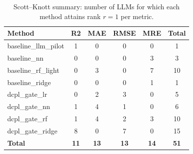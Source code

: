 \begin{table}[t]
\centering
\scriptsize
\setlength{\tabcolsep}{4pt}
\renewcommand{\arraystretch}{1.1}
\caption{Scott--Knott summary: number of LLMs for which each method attains rank $r=1$ per metric.}
\label{tab:sk_summary_rank1_by_metric}
\begin{tabular}{l|ccccc}
\hline
\textbf{Method} & \textbf{R2} & \textbf{MAE} & \textbf{RMSE} & \textbf{MRE} & \textbf{Total} \\
\hline
baseline\_llm\_pilot & 1 & 0 & 0 & 0 & 1 \\
baseline\_nn & 0 & 0 & 0 & 3 & 3 \\
baseline\_rf\_light & 0 & 3 & 0 & 7 & 10 \\
baseline\_ridge & 0 & 0 & 0 & 1 & 1 \\
dcpl\_gate\_lr & 0 & 2 & 3 & 0 & 5 \\
dcpl\_gate\_nn & 1 & 4 & 1 & 0 & 6 \\
dcpl\_gate\_rf & 1 & 4 & 2 & 3 & 10 \\
dcpl\_gate\_ridge & 8 & 0 & 7 & 0 & 15 \\
\hline
\textbf{Total} & \textbf{11} & \textbf{13} & \textbf{13} & \textbf{14} & \textbf{51} \\
\hline
\end{tabular}
\end{table}